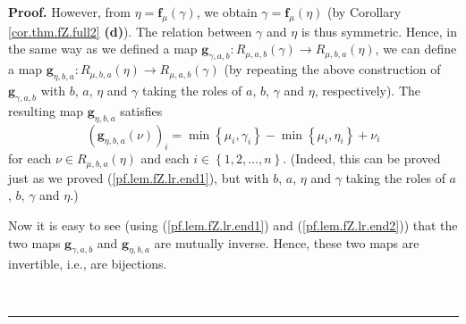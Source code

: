 \documentclass[numbers=enddot,12pt,final,onecolumn,notitlepage]{scrartcl}%
\theoremstyle{definition}
\newenvironment{proof}[1][Proof]{\noindent\textbf{#1.} }{\ \rule{0.5em}{0.5em}}
\newenvironment{vershort}{}{}
\begin{document}
\begin{proof}
However, from $\eta=\mathbf{f}_{\mu}\left(  \gamma\right)  $, we obtain
$\gamma=\mathbf{f}_{\mu}\left(  \eta\right)  $ (by Corollary
\ref{cor.thm.fZ.full2} \textbf{(d)}). The relation between $\gamma$ and $\eta$
is thus symmetric. Hence, in the same way as we defined a map $\mathbf{g}%
_{\gamma,a,b}:R_{\mu,a,b}\left(  \gamma\right)  \rightarrow R_{\mu,b,a}\left(
\eta\right)  $, we can define a map $\mathbf{g}_{\eta,b,a}:R_{\mu,b,a}\left(
\eta\right)  \rightarrow R_{\mu,a,b}\left(  \gamma\right)  $ (by repeating the
above construction of $\mathbf{g}_{\gamma,a,b}$ with $b$, $a$, $\eta$ and
$\gamma$ taking the roles of $a$, $b$, $\gamma$ and $\eta$, respectively). The
resulting map $\mathbf{g}_{\eta,b,a}$ satisfies%
\begin{equation}
\left(  \mathbf{g}_{\eta,b,a}\left(  \nu\right)  \right)  _{i}=\min\left\{
\mu_{i},\gamma_{i}\right\}  -\min\left\{  \mu_{i},\eta_{i}\right\}  +\nu_{i}
\label{pf.lem.fZ.lr.end2}%
\end{equation}
for each $\nu\in R_{\mu,b,a}\left(  \eta\right)  $ and each $i\in\left\{
1,2,\ldots,n\right\}  $. (Indeed, this can be proved just as we proved
(\ref{pf.lem.fZ.lr.end1}), but with $b$, $a$, $\eta$ and $\gamma$ taking the
roles of $a$, $b$, $\gamma$ and $\eta$.)

\begin{vershort}
Now it is easy to see (using (\ref{pf.lem.fZ.lr.end1}) and
(\ref{pf.lem.fZ.lr.end2})) that the two maps $\mathbf{g}_{\gamma,a,b}$ and
$\mathbf{g}_{\eta,b,a}$ are mutually inverse. Hence, these two maps are
invertible, i.e., are bijections.
\end{vershort}


\end{proof}
\end{document}
